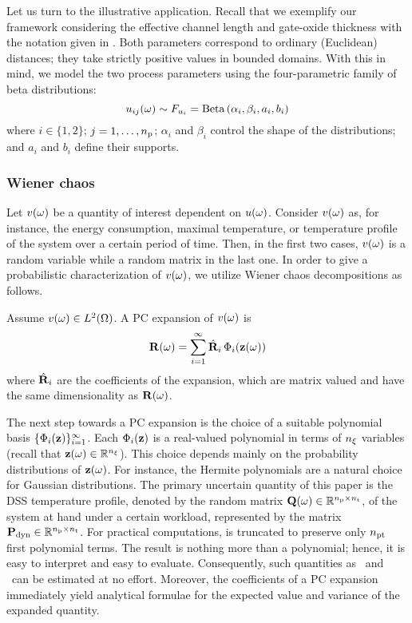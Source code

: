 Let us turn to the illustrative application.
Recall that we exemplify our framework considering the effective channel length and gate-oxide thickness with the notation given in .
Both parameters correspond to ordinary (Euclidean) distances; they take strictly positive values in bounded domains.
With this in mind, we model the two process parameters using the four-parametric family of beta distributions:
\begin{equation*}
  u_{ij}(\omega) \sim F_{u_i} = \text{Beta}\left( \alpha_i, \beta_i, a_i, b_i \right)
\end{equation*}
where $i \in \{ 1, 2 \}$; $j = 1, \dots, {n_\text{p}}$; $\alpha_i$ and $\beta_i$ control the shape of the distributions; and $a_i$ and $b_i$ define their supports.

\subsubsection{Wiener chaos}
Let $v(\omega)$ be a quantity of interest dependent on $u(\omega)$.
Consider $v(\omega)$ as, for instance, the energy consumption, maximal temperature, or temperature profile of the system over a certain period of time.
Then, in the first two cases, $v(\omega)$ is a random variable while a random matrix in the last one.
In order to give a probabilistic characterization of $v(\omega)$, we utilize Wiener chaos decompositions as follows.

Assume $v(\omega) \in L^{2}(\Omega)$.
A PC expansion of $v(\omega)$ is
\begin{equation} \elab{polynomial-chaos-expansion}
  \mR(\o) = \sum_{i = 1}^\infty \pcc{\mR}_i \, \pcb_i(\vZ(\o))
\end{equation}
where $\hat{\mathbf{R}}_i$ are the coefficients of the expansion, which are matrix valued and have the same dimensionality as $\mathbf{R}(\omega)$.

The next step towards a PC expansion is the choice of a suitable polynomial basis $\{ \Phi_i(\mathbf{z}) \}_{i = 1}^\infty$.
Each $\Phi_i(\mathbf{z})$ is a real-valued polynomial in terms of ${n_\xi}$ variables (recall that $\mathbf{z}(\omega) \in \mathbb{R}^{n_\xi}$).
This choice depends mainly on the probability distributions of $\mathbf{z}(\omega)$.
For instance, the Hermite polynomials are a natural choice for Gaussian distributions.
The primary uncertain quantity of this paper is the DSS temperature profile, denoted by the random matrix $\mathbf{Q}(\omega) \in \mathbb{R}^{{n_\text{p}} \times {n_\text{t}}}$, of the system at hand under a certain workload, represented by the matrix $\mathbf{P}_{\text{dyn}} \in \mathbb{R}^{{n_\text{p}} \times {n_\text{t}}}$.
For practical computations,  is truncated to preserve only ${n_\text{pt}}$ first polynomial terms.
The result is nothing more than a polynomial; hence, it is easy to interpret and easy to evaluate.
Consequently, such quantities as \cdfs\ and \pdfs\ can be estimated at no effort.
Moreover, the coefficients of a PC expansion immediately yield analytical formulae for the expected value and variance of the expanded quantity.

